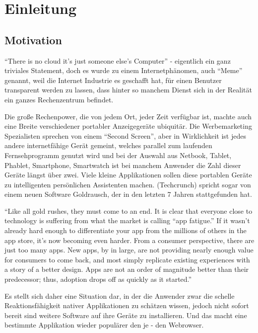 \chapter{Einleitung}

\section{Motivation}

 ``There is no cloud it's just someone else's Computer'' - eigentlich ein ganz
 triviales Statement, doch es wurde zu einem Internetphänomen, auch ``Meme''
 genannt, weil die Internet Industrie es geschafft hat, für einen Benutzer
 transparent werden zu lassen, dass hinter so manchem Dienst sich in der
 Realität ein ganzes Rechenzentrum befindet.

Die große Rechenpower, die von jedem Ort, jeder Zeit verfügbar ist, machte auch
eine Breite verschiedener portabler Anzeigegeräte ubiquitär. Die Werbemarketing
Spezialisten sprechen von einem ``Second Screen'', aber in Wirklichkeit ist
jedes andere internetfähige Gerät gemeint, welches parallel zum laufenden
Fernsehprogramm genutzt wird und bei der Auswahl aus Netbook, Tablet, Phablet,
Smartphone, Smartwatch ist bei manchem Anwender die Zahl dieser Geräte
längst über zwei. Viele kleine Applikationen sollen diese portablen Geräte zu intelligenten
persönlichen Assistenten machen. (Techcrunch) spricht sogar von einem neuen
Software Goldrausch, der in den letzten 7 Jahren stattgefunden hat.

``Like all gold rushes, they must come to an end. It is clear that everyone
close to technology is suffering from what the market is calling “app fatigue.”
If it wasn’t already hard enough to differentiate your app from the millions of
others in the app store, it’s now becoming even harder.
From a consumer perspective, there are just too many apps. New apps, by in large, are not providing nearly enough value for consumers to come back, and most simply replicate existing experiences with a story of a better design. Apps are not an order of magnitude better than their predecessor; thus, adoption drops off as quickly as it started.''

Es stellt sich daher eine Situation dar, in der die Anwender zwar die schelle
Reaktionsfähigkeit nativer Applikationen zu schätzen wissen, jedoch nicht sofort bereit
sind weitere Software auf ihre Geräte zu installieren. Und das macht eine bestimmte
Applikation wieder populärer den je - den Webrowser.


